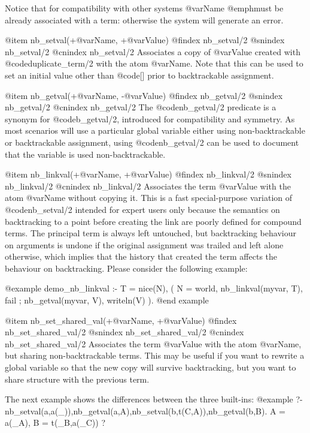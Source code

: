 {{{{{{Notice that for compatibility with other systems @var{Name} @emph{must} be already associated with a term: otherwise the system will generate an error.

@item nb_setval(+@var{Name}, +@var{Value}) 
@findex nb_setval/2
@snindex nb_setval/2
@cnindex nb_setval/2
Associates a copy of @var{Value} created with @code{duplicate_term/2} with
the atom @var{Name}. Note that this can be used to set an initial
value other than @code{[]} prior to backtrackable assignment.

@item nb_getval(+@var{Name}, -@var{Value}) 
@findex nb_getval/2
@snindex nb_getval/2
@cnindex nb_getval/2
The @code{nb_getval/2} predicate is a synonym for @code{b_getval/2},
introduced for compatibility and symmetry. As most scenarios will use
a particular global variable either using non-backtrackable or
backtrackable assignment, using @code{nb_getval/2} can be used to
document that the variable is used non-backtrackable.

@item nb_linkval(+@var{Name}, +@var{Value}) 
@findex nb_linkval/2
@snindex nb_linkval/2
@cnindex nb_linkval/2
Associates the term @var{Value} with the atom @var{Name} without
copying it. This is a fast special-purpose variation of @code{nb_setval/2}
intended for expert users only because the semantics on backtracking
to a point before creating the link are poorly defined for compound
terms. The principal term is always left untouched, but backtracking
behaviour on arguments is undone if the original assignment was
trailed and left alone otherwise, which implies that the history that
created the term affects the behaviour on backtracking. Please
consider the following example:

@example
demo_nb_linkval :-
        T = nice(N),
        (   N = world,
            nb_linkval(myvar, T),
            fail
        ;   nb_getval(myvar, V),
            writeln(V)
        ).
@end example

@item nb_set_shared_val(+@var{Name}, +@var{Value}) 
@findex nb_set_shared_val/2
@snindex nb_set_shared_val/2
@cnindex nb_set_shared_val/2
Associates the term @var{Value} with the atom @var{Name}, but sharing
non-backtrackable terms. This may be useful if you want to rewrite a
global variable so that the new copy will survive backtracking, but
you want to share structure with the previous term.

The next example shows the differences between the three built-ins:
@example
?- nb_setval(a,a(_)),nb_getval(a,A),nb_setval(b,t(C,A)),nb_getval(b,B).
A = a(_A),
B = t(_B,a(_C)) ? 

}}}}}}

